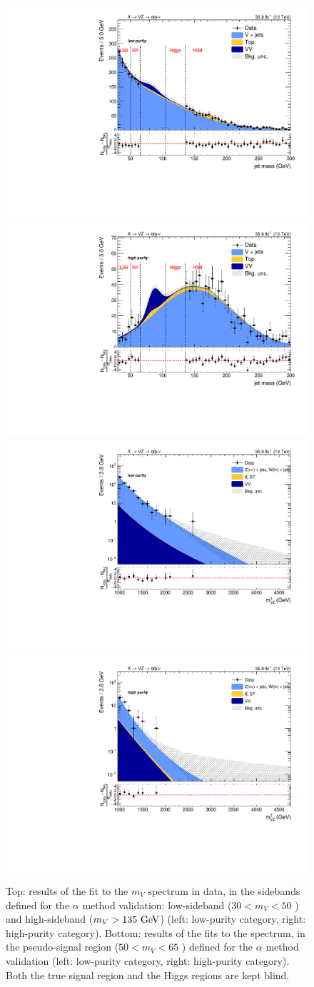 \begin{figure}[!htb]
  \centering
    \includegraphics[width=.495\textwidth]{plotsAlpha_tesi/XVZnnlp/JetMass_extr.pdf}
    \includegraphics[width=.495\textwidth]{plotsAlpha_tesi/XVZnnhp/JetMass_extr.pdf}
    \\
    \includegraphics[width=.495\textwidth]{plotsAlpha_tesi/XVZnnlp/BkgSR_extr.pdf}%
    \includegraphics[width=.495\textwidth]{plotsAlpha_tesi/XVZnnhp/BkgSR_extr.pdf}%
  \caption{Top: results of the fit to the $m_V$ spectrum in data, in the sidebands defined for the $\alpha$ method validation: low-sideband ($30 < m_V < 50$ \GeV) and high-sideband ($m_V > 135~\text{GeV}$) (left: low-purity category, right: high-purity category). Bottom: results of the fits to the \mtVZ spectrum, in the pseudo-signal region ($50 < m_V < 65$ \GeV) defined for the $\alpha$ method validation (left: low-purity category, right: high-purity category). Both the true signal region and the Higgs regions are kept blind.}
  \label{fig:alphaClosure}
\end{figure}

